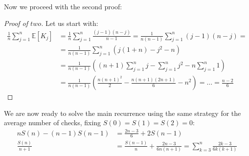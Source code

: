 Now we proceed with the second proof:
\begin{proof}[Proof of $two$]
  Let us start with:
  \begin{displaymath}
    \begin{split}
      \frac{1}{n}\sum_{j=1}^{n}{\mathbb{E} \left[K_j \right] } &=
      \frac{1}{n} \sum_{j=1}^{n}{\frac{(j-1)(n-j)}{n-1}} =
      \frac{1}{n(n-1)} \sum_{j=1}^{n}{(j-1)(n-j)}=\\
      &=\frac{1}{n(n-1)} \sum_{j=1}^{n}{(j(1+n)-j^2-n)} \\
      &=\frac{1}{n(n-1)} \left( (n+1)\sum_{j=1}^{n}{j} -
        \sum_{j=1}^{n}{j^2} -n \sum_{j=1}^{n}{1}  \right)\\
      &=\frac{1}{n(n-1)}\left( \frac{n(n+1)^2}{2} -
        \frac{n(n+1)(2n+1)}{6} - n^2 \right) = \ldots =  \frac{n-2}{6} 
    \end{split}
  \end{displaymath} 
\end{proof}

We are now ready to solve the main recurrence using the same strategy
for the average number of checks, fixing $S(0) = S(1) = S(2) = 0$:
\begin{displaymath}
  \begin{split}
    nS(n) - (n-1)S(n-1) &=  \frac{2n-3}{6} + 2S(n-1)\\
    \frac{S(n)}{n+1} &=  \frac{S(n-1)}{n} +  \frac{2n -3}{6n(n+1)} =
      \sum_{k=3}^{n}{ \frac{2k-3}{6k(k+1)} }  
  \end{split}
\end{displaymath}

